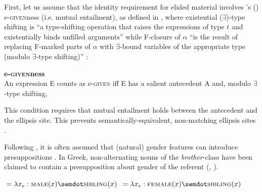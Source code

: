 \documentclass[output=paper,
modfonts,
newtxmath,
hidelinks
]{langscibook}
\begin{document}
		First, let us assume that the identity requirement for elided material involves \citeauthor{merchant2001}'s (\citeyear{merchant2001}) e-\textsc{given}ness (i.e. mutual entailment), as defined in , where existential ($\exists$)-type shifting is ``a type-shifting operation that raises the expressions of type $t$ and existentially binds unfilled arguments'' while F-closure of $\alpha$ ``is the result of replacing F-marked parts of $\alpha$ with $\exists$-bound variables of the appropriate type (modulo $\exists$-type shifting)'' \citep[14]{merchant2001}: 
		
		\ea \label{14:egive} \textbf{e-\textsc{given}ness} \citep[26]{merchant2001}\\
		An expression E counts as e-\textsc{given} iff E has a salient antecedent A and, modulo $\exists$-type shifting,
        \begin{xlist}
        \end{xlist}
        \z

     
\noindent This condition requires that mutual entailment holds between the antecedent and the ellipsis site. This prevents semantically-equivalent, non-matching ellipsis sites  \citet[27]{merchant2001}.
		
		\ea
		\label{14:ex20a}
		\label{14:ex20b}
        \z \z
        
\noindent Following \citet{cooper83}, it is often assumed that (natural) gender features can introduce presuppositions \citep[also see][]{sauerland03,sauerland08,heim08,kratzer09,spathas10,sudo-diss}.
		In Greek, non-alternating nouns of the \textit{brother}-class have been claimed to contain a presupposition about gender of the referent  (\citealt[19]{merchant14}, \citealt[715]{sudospathas-sub20}).
		
		\ea \label{14:ex21}
		\ea {}${}=\lambda x_e : \textsc{male}(x)\semdot \textsc{sibling}(x)$
		\ex {}${}=\lambda x_e : \textsc{female}(x)\semdot \textsc{sibling}(x)$	         
        \z \z
        
\end{document}
